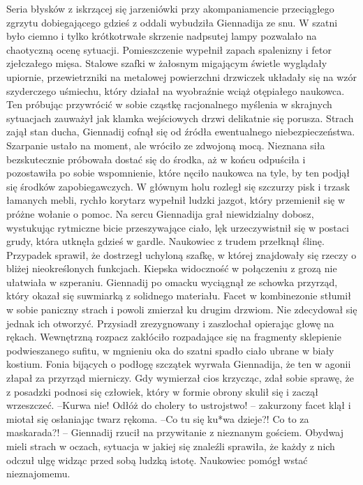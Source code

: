 \documentclass[../MAIN.tex]{subfiles}
\begin{document}
Seria błysków z iskrzącej się jarzeniówki przy akompaniamencie przeciągłego zgrzytu dobiegającego gdzieś z oddali wybudziła Giennadija ze snu. W szatni było ciemno i tylko krótkotrwałe skrzenie nadpsutej lampy pozwalało na chaotyczną ocenę sytuacji. Pomieszczenie wypełnił zapach spalenizny i fetor zjełczałego mięsa. Stalowe szafki w żałosnym migającym świetle wyglądały upiornie, przewietrzniki na metalowej powierzchni drzwiczek układały się na wzór szyderczego uśmiechu, który działał na wyobraźnie wciąż otępiałego naukowca. Ten próbując przywrócić w sobie cząstkę racjonalnego myślenia w skrajnych sytuacjach zauważył jak klamka wejściowych drzwi delikatnie się porusza. Strach zajął stan ducha, Giennadij cofnął się od źródła ewentualnego niebezpieczeństwa. Szarpanie ustało na moment, ale wróciło ze zdwojoną mocą. Nieznana siła bezskutecznie próbowała dostać się do środka, aż w końcu odpuściła i pozostawiła po sobie wspomnienie, które nęciło naukowca na tyle, by ten podjął się środków zapobiegawczych. W głównym holu rozległ się szczurzy pisk i trzask łamanych mebli, rychło korytarz wypełnił ludzki jazgot, który przemienił się w próżne wołanie o pomoc. Na sercu Giennadija grał niewidzialny dobosz, wystukując rytmiczne bicie przeszywające ciało, lęk urzeczywistnił się w postaci grudy, która utknęła gdzieś w gardle. Naukowiec z trudem przełknął ślinę. Przypadek sprawił, że dostrzegł uchyloną szafkę, w której znajdowały się rzeczy o bliżej nieokreślonych funkcjach. Kiepska widoczność w połączeniu z grozą nie ułatwiała w szperaniu. Giennadij po omacku wyciągnął ze schowka przyrząd, który okazał się suwmiarką z solidnego materiału. Facet w kombinezonie stłumił w sobie paniczny strach i powoli zmierzał ku drugim drzwiom. Nie zdecydował się jednak ich otworzyć. Przysiadł zrezygnowany i zaszlochał opierając głowę na rękach. Wewnętrzną rozpacz zakłóciło rozpadające się na fragmenty sklepienie podwieszanego sufitu, w mgnieniu oka do szatni spadło ciało ubrane w biały kostium. Fonia bijących o podłogę szczątek wyrwała Giennadija, że ten w agonii złapał za przyrząd mierniczy. Gdy wymierzał cios krzycząc, zdał sobie sprawę, że z posadzki podnosi się człowiek, który w formie obrony skulił się i zaczął wrzeszczeć. 
--Kurwa nie! Odłóż do cholery to ustrojstwo! -- zakurzony facet klął i miotał się osłaniając twarz rękoma. 
--Co tu się ku*wa dzieje?! Co to za maskarada?! -- Giennadij rzucił na przywitanie z nieznanym gościem. 
Obydwaj mieli strach w oczach, sytuacja w jakiej się znaleźli sprawiła, że każdy z nich odczuł ulgę widząc przed sobą ludzką istotę. Naukowiec pomógł wstać nieznajomemu. 
\end{document}
